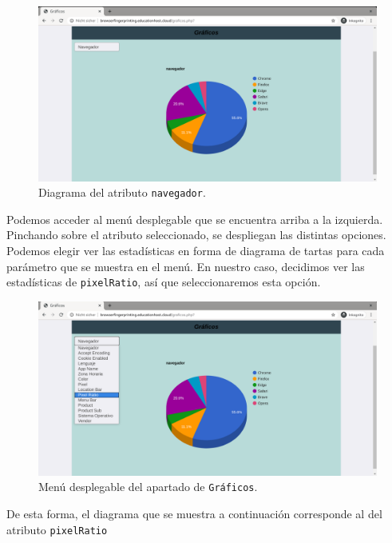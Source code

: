 \begin{figure}[H]
	\centering
	\includegraphics[width=1\textwidth]{Images/navegadorChart.png}
	\caption{Diagrama del atributo \texttt{navegador}.}
	\label{fig:navegadorChart}
\end{figure}

Podemos acceder al menú desplegable que se encuentra arriba a la izquierda. Pinchando sobre el atributo seleccionado, se despliegan las distintas opciones. Podemos elegir ver las estadísticas en forma de diagrama de tartas para cada parámetro que se muestra en el menú. En nuestro caso, decidimos ver las estadísticas de \texttt{pixelRatio}, así que seleccionaremos esta opción.

\begin{figure}[H]
	\centering
	\includegraphics[width=1\textwidth]{Images/menuChart.png}
	\caption{Menú desplegable del apartado de \texttt{Gráficos}.}
	\label{fig:menuChart}
\end{figure}

De esta forma, el diagrama que se muestra a continuación corresponde al del atributo \texttt{pixelRatio}


